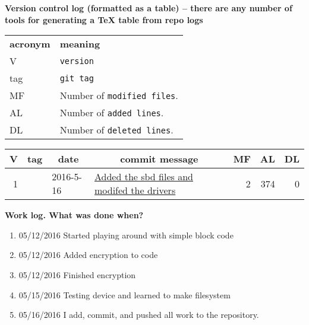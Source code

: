 \documentclass[draftclsnofoot,onecolumn,letterpaper,10pt,titlepage]{IEEEtran}
\begin{document}
\textbf{Version control log (formatted as a table) -- there are any number of tools for generating a TeX table from repo logs}
\begin{tabular}{lp{12cm}}
  \label{tabular:legend:git-log}
  \textbf{acronym} & \textbf{meaning} \\
  V & \texttt{version} \\
  tag & \texttt{git tag} \\
  MF & Number of \texttt{modified files}. \\
  AL & Number of \texttt{added lines}. \\
  DL & Number of \texttt{deleted lines}. \\
\end{tabular}

\bigskip

\noindent
\begin{tabular}{|rllp{7.5cm}rrr|}
\hline \multicolumn{1}{|c}{\textbf{V}} & \multicolumn{1}{c}{\textbf{tag}}
& \multicolumn{1}{c}{\textbf{date}}
& \multicolumn{1}{c}{\textbf{commit message}} & \multicolumn{1}{c}{\textbf{MF}}
& \multicolumn{1}{c}{\textbf{AL}} & \multicolumn{1}{c|}{\textbf{DL}} \\ \hline

\hline 1 &  & 2016-5-16 & \href{https://github.com/umagatl/cs444-135/commit/37323a7c5ce8dc4cfaa7fc771286adf6b35ba0fd}{Added the sbd files and modifed the drivers} & 2 & 374 & 0 \\
\hline
\end{tabular}

\textbf{Work log. What was done when?}
\begin{enumerate}
\item 05/12/2016 Started playing around with simple block code
\item 05/12/2016 Added encryption to code 
\item 05/12/2016 Finished encryption
\item 05/15/2016 Testing device and learned to make filesystem
\item 05/16/2016 I add, commit, and pushed all work to the repository.
\end{enumerate}
\end{document}
